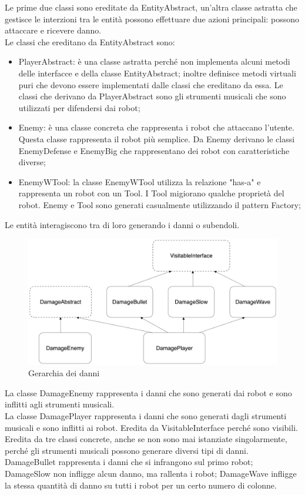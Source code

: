 \documentclass[11pt]{article}
\begin{document}
Le prime due classi sono ereditate da EntityAbstract, un'altra classe astratta 
che gestisce le interzioni tra le entità possono effettuare due azioni 
principali: possono attaccare e ricevere danno. \\
Le classi che ereditano da EntityAbstract sono:
\begin{itemize}
	\item PlayerAbstract: è una classe astratta perché non implementa alcuni
		metodi delle interfacce e della classe EntityAbstract; inoltre definisce
		metodi virtuali puri che devono essere implementati dalle classi che
		ereditano da essa. Le classi che derivano da PlayerAbstract sono gli
		strumenti musicali che sono utilizzati per difendersi dai robot;

	\item Enemy: è una classe concreta che rappresenta i robot che attaccano
		l'utente. Questa classe rappresenta il robot più semplice. Da Enemy
		derivano le classi EnemyDefense e EnemyBig che rappresentano dei robot
		con caratteristiche diverse;

	\item EnemyWTool: la classe EnemyWTool utilizza la relazione "has-a" e
		rappresenta un robot con un Tool. I Tool migiorano qualche proprietà del 
		robot. Enemy e Tool sono generati casualmente utilizzando il pattern
		Factory;
\end{itemize}

Le entità interagiscono tra di loro generando i danni o subendoli.

\begin{figure}[ht]
	\centering
	\includegraphics[scale = 0.05]{assets/damage}
	\caption{Gerarchia dei danni}
\end{figure}

La classe DamageEnemy rappresenta i danni che sono generati dai robot e sono
inflitti agli strumenti musicali. \\
La classe DamagePlayer rappresenta i danni che sono generati dagli strumenti
musicali e sono inflitti ai robot. Eredita da VisitableInterface perché
sono visibili. Eredita da tre classi concrete, anche se non sono mai istanziate
singolarmente, perché gli strumenti musicali possono generare diversi tipi di
danni. DamageBullet rappresenta i danni che si infrangono sul primo robot;
DamageSlow non infligge alcun danno, ma rallenta i robot; DamageWave infligge la
stessa quantità di danno su tutti i robot per un certo numero di colonne.
\end{document}
